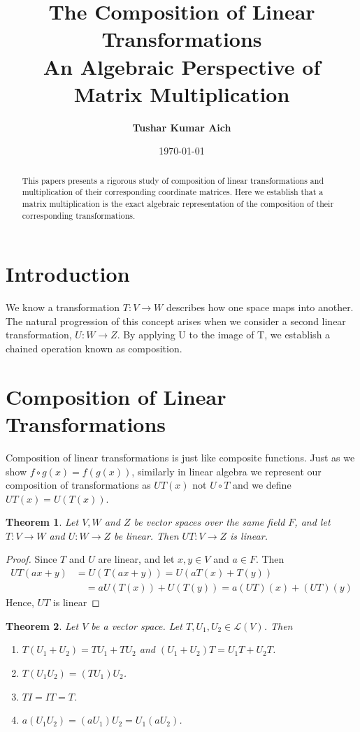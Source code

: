 \documentclass[12pt, a4paper]{article}
\title{\textbf{\Large The Composition of Linear Transformations \\ \large An Algebraic Perspective of Matrix Multiplication}}
\author{\textbf{Tushar Kumar Aich}}
\date{\today}
\newtheorem{theorem}{Theorem}[section]
\theoremstyle{definition}
\theoremstyle{remark}
\begin{document}
\maketitle

\begin{abstract}
    This papers presents a rigorous study of composition of linear transformations and multiplication of their corresponding coordinate matrices. Here we establish that a matrix multiplication is the exact algebraic representation of the composition of their corresponding transformations.
\end{abstract}

\section{Introduction}
We know a transformation $T: V \to W$ describes how one space maps into another. The natural progression of this concept arises when we consider a second linear transformation, $U: W \to Z$. By applying U to the image of T, we establish a chained operation known as composition.

\section{Composition of Linear Transformations}
Composition of linear transformations is just like composite functions. Just as we show $f \circ g (x) = f(g(x))$, similarly in linear algebra we represent our composition of transformations as $UT(x)$ not $U \circ T$ and we define $UT(x) = U(T(x))$.

\begin{theorem}
    Let $V, W$ and $Z$ be vector spaces over the same field $F$, and let $T:V \to W$ and $U:W \to Z$ be linear. Then $UT:V \to Z$ is linear.
\end{theorem}

\begin{proof}
    Since $T$ and $U$ are linear, and let $x,y \in V$ and $a \in F$. Then
    \begin{align*}
        UT(ax+y) &= U(T(ax+y)) = U(aT(x)+T(y)) \\
        & \quad = aU(T(x)) +U(T(y)) = a (UT)(x) + (UT)(y)
    \end{align*}
    Hence, $UT$ is linear 
\end{proof}

\begin{theorem}
    Let $V$ be a vector space. Let $T,U_1, U_2 \in \mathscr{L}(V)$. Then
    \begin{enumerate}
        \item $T(U_1+U_2)=TU_1+TU_2$ and $(U_1+U_2)T=U_1T+U_2T$.
        \item $T(U_1U_2)=(TU_1)U_2$.
        \item $TI=IT=T$.
        \item $a(U_1U_2)=(aU_1)U_2=U_1(aU_2)$.
    \end{enumerate}
\end{theorem}
\end{document}
